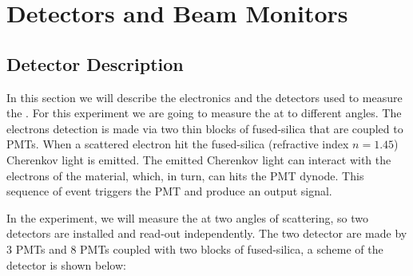 \newpage
\section{Detectors and Beam Monitors}

\subsection{Detector Description}


In this section we will describe the electronics and the detectors used to measure the \transv .
For this experiment we are going to measure the \transv at to different angles. The electrons detection is 
made via two thin blocks of fused-silica that are coupled to PMTs. When a scattered electron hit the fused-silica (refractive index $n = 1.45$) Cherenkov light is emitted. The emitted Cherenkov light can interact with the electrons of the material, which, in turn, can hits the PMT dynode. This sequence of event triggers the PMT and produce an output signal.

In the experiment, we will measure the \transv at two angles of scattering, so two detectors are installed and read-out independently. The two detector are made by 3 PMTs and 8 PMTs coupled with two blocks of fused-silica, a scheme of the detector is shown below:

